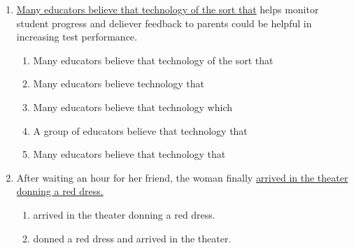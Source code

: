 \begin{enumerate}
\begin{spacing}{1.5}
\begin{enumerate}[label=(\Alph*)]
\hrulefill
\item featured many actors that were well-respected and won many awards for

\hrulefill
\item had featured many well-respected actors and won many awards for

\hrulefill
\item featured many well-respected actors and won many awards for

\hrulefill
\end{enumerate}
\end{spacing}

\bigskip
\item \ul{Many educators believe that technology of the sort that} helps monitor student progress and deliever feedback to parents could be helpful in increasing test performance. 

\begin{spacing}{1.5}
\begin{enumerate}[label=(\Alph*)]
\item Many educators believe that technology of the sort that

\hrulefill
\item Many educators believe technology that

\hrulefill
\item Many educators believe that technology which

\hrulefill
\item A group of educators believe that technology that

\hrulefill
\item Many educators believe that technology that

\hrulefill
\end{enumerate}
\end{spacing}

\bigskip
\item After waiting an hour for her friend, the woman finally \ul{arrived in the theater donning a red dress.}

\begin{spacing}{1.5}
\begin{enumerate}[label=(\Alph*)]
\item arrived in the theater donning a red dress.

\hrulefill

\item donned a red dress and arrived in the theater.

\hrulefill


\end{enumerate}
\end{spacing}
\end{enumerate}
